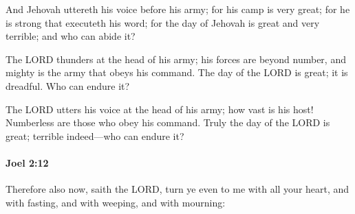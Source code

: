 			\begin{versebox}
					\item[BHS] 
					\item[LXX] 
					\item[ASV] And Jehovah uttereth his voice before his army; for his camp is very great; for he is strong that executeth his word; for the day of Jehovah is great and very terrible; and who can abide it?
					\item[NIV] The LORD thunders at the head of his army; his forces are beyond number, and mighty is the army that obeys his command. The day of the LORD is great; it is dreadful. Who can endure it?
					\item[NRSV] The LORD utters his voice at the head of his army; how vast is his host! Numberless are those who obey his command. Truly the day of the LORD is great; terrible indeed—who can endure it?
			\end{versebox}

		\paragraph{Joel 2:12} %
			\label{JOEL-2-12}

			Therefore also now, saith the LORD, turn ye even to me with all your heart, and with fasting, and with weeping, and with mourning:

